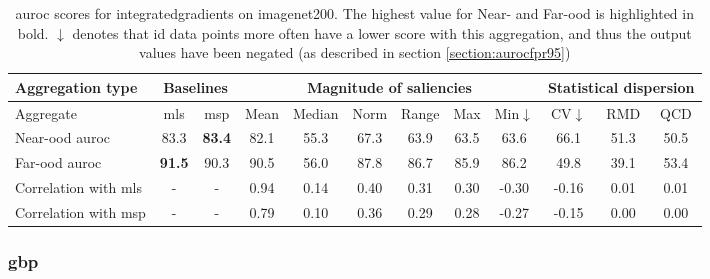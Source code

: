 \documentclass[UKenglish]{uiomasterthesis} %
\theoremstyle{definition}
\begin{document}
\begin{table}[H]
\setlength\tabcolsep{4pt}
\begin{center}
\begin{tabular}{ |m{5em}|c c|c c c c c c|c c c| }
    \hline
     Aggregation type & \multicolumn{2}{c|}{Baselines} & \multicolumn{6}{c|}{Magnitude of saliencies} & \multicolumn{3}{c|}{Statistical dispersion} \\
    \hline
    Aggregate & \ac{mls} & \ac{msp} & Mean & Median & Norm & Range & Max & Min$\downarrow$ & CV$\downarrow$ & RMD & QCD  \\
    \hline
    \rowcolor{near!50}
    Near-\ac{ood} \ac{auroc} & 83.3 &\textbf{ 83.4 }& 82.1 & 55.3 & 67.3 & 63.9 & 63.5 & 63.6 & 66.1 & 51.3 & 50.5  \\
    \hline
    \rowcolor{far!50}
    Far-\ac{ood} \ac{auroc} &\textbf{ 91.5 }& 90.3 & 90.5 & 56.0 & 87.8 & 86.7 & 85.9 & 86.2 & 49.8 & 39.1 & 53.4  \\
    \hline
    Correlation with \ac{mls}& - & - & 0.94 & 0.14 & 0.40 & 0.31 & 0.30 & -0.30 & -0.16 & 0.01 & 0.01  \\
    \hline
    Correlation with \ac{msp}& - & - & 0.79 & 0.10 & 0.36 & 0.29 & 0.28 & -0.27 & -0.15 & 0.00 & 0.00  \\
    \hline
    \end{tabular}
    \caption{\ac{auroc} scores for integratedgradients on imagenet200. The highest value for Near- and Far-\ac{ood} is highlighted in bold. $\downarrow$ denotes that \ac{id} data points more often have a lower score with this aggregation, and thus the output values have been negated (as described in section \ref{section:aurocfpr95})}
    \label{table:imagenet200_integratedgradients_metrics}
\end{center}
\setlength\tabcolsep{6pt}
\end{table}

\subsubsection{\ac{gbp}}
\end{document}

